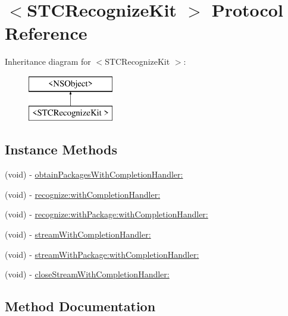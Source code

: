 \hypertarget{protocol_s_t_c_recognize_kit_01-p}{}\section{$<$S\+T\+C\+Recognize\+Kit $>$ Protocol Reference}
\label{protocol_s_t_c_recognize_kit_01-p}
Inheritance diagram for $<$S\+T\+C\+Recognize\+Kit $>$\+:\begin{figure}[H]
\begin{center}
\leavevmode
\includegraphics[height=2.000000cm]{protocol_s_t_c_recognize_kit_01-p}
\end{center}
\end{figure}
\subsection*{Instance Methods}
\begin{DoxyCompactItemize}
\item 
(void) -\/ \hyperlink{protocol_s_t_c_recognize_kit_01-p_a045faae471fb24ae41f0b40d24d41914}{obtain\+Packages\+With\+Completion\+Handler\+:}
\item 
(void) -\/ \hyperlink{protocol_s_t_c_recognize_kit_01-p_a6b2b5a9ecc1f659c4d7633d113f00d8a}{recognize\+:with\+Completion\+Handler\+:}
\item 
(void) -\/ \hyperlink{protocol_s_t_c_recognize_kit_01-p_a31162bfe362dcd4b961caa831a4dbbf3}{recognize\+:with\+Package\+:with\+Completion\+Handler\+:}
\item 
(void) -\/ \hyperlink{protocol_s_t_c_recognize_kit_01-p_a58204f2dc5b86abc83745d837013a1eb}{stream\+With\+Completion\+Handler\+:}
\item 
(void) -\/ \hyperlink{protocol_s_t_c_recognize_kit_01-p_a80d49abc983107365e536a1bda519a95}{stream\+With\+Package\+:with\+Completion\+Handler\+:}
\item 
(void) -\/ \hyperlink{protocol_s_t_c_recognize_kit_01-p_af0ba32b0cf088bffe33b030c4ae5f572}{close\+Stream\+With\+Completion\+Handler\+:}
\end{DoxyCompactItemize}


\subsection{Method Documentation}
\hypertarget{protocol_s_t_c_recognize_kit_01-p_af0ba32b0cf088bffe33b030c4ae5f572}{}\label{protocol_s_t_c_recognize_kit_01-p_af0ba32b0cf088bffe33b030c4ae5f572} 
